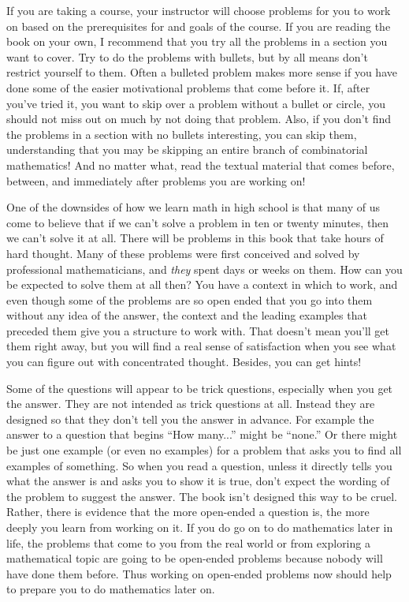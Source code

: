 \documentclass[10pt,]{book}
\theoremstyle{plain}
\theoremstyle{definition}
\numberwithin{equation}{chapter}
\begin{document}
\par
If you are taking a course, your instructor will choose problems for you to work on based on the prerequisites for and goals of the course. If you are reading the book on your own, I recommend that you try all the problems in a section you want to cover. Try to do the problems with bullets, but by all means don't restrict yourself to them. Often a bulleted problem makes more sense if you have done some of the easier motivational problems that come before it. If, after you’ve tried it, you want to skip over a problem without a bullet or circle, you should not miss out on much by not doing that problem. Also, if you don't find the problems in a section with no bullets interesting, you can skip them, understanding that you may be skipping an entire branch of combinatorial mathematics! And no matter what, read the textual material that comes before, between, and immediately after problems you are working on!%
\par
One of the downsides of how we learn math in high school is that many of us come to believe that if we can't solve a problem in ten or twenty minutes, then we can't solve it at all.  There will be problems in this book that take hours of hard thought.  Many of these problems were first conceived and solved by professional mathematicians, and \emph{they} spent days or weeks on them. How can you be expected to solve them at all then? You have a context in which to work, and even though some of the problems are so open ended that you go into them without any idea of the answer, the context and the leading examples that preceded them give you a structure to work with. That doesn't mean you'll get them right away, but you will find a real sense of satisfaction when you see what you can figure out with concentrated thought. Besides, you can get hints!%
\par
Some of the questions will appear to be trick questions, especially when you get the answer. They are not intended as trick questions at all. Instead they are designed so that they don't tell you the answer in advance. For example the answer to a question that begins ``How many...'' might be ``none.'' Or there might be just one example (or even no examples) for a problem that asks you to find all examples of something. So when you read a question, unless it directly tells you what the answer is and asks you to show it is true, don't expect the wording of the problem to suggest the answer. The book isn't designed this way to be cruel. Rather, there is evidence that the more open-ended a question is, the more deeply you learn from working on it. If you do go on to do mathematics later in life, the problems that come to you from the real world or from exploring a mathematical topic are going to be open-ended problems because nobody will have done them before. Thus working on open-ended problems now should help to prepare you to do mathematics later on.%
\end{document}
